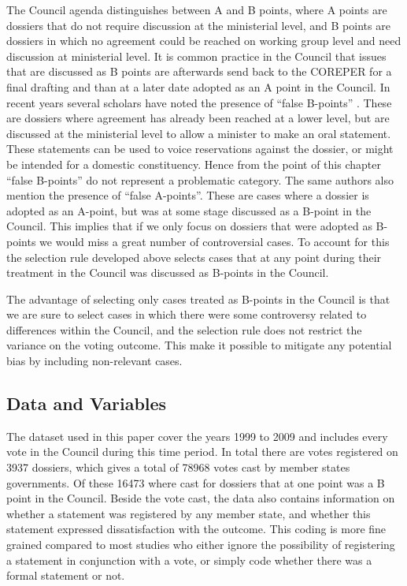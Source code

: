 The Council agenda distinguishes between A and B points, where A points are dossiers that do not require discussion at the ministerial level, and B points are dossiers in which no agreement could be reached on working group level and need discussion at ministerial level. It is common practice in the Council that issues that are discussed as B points are afterwards send back to the COREPER for a final drafting and than at a later date adopted as an A point in the Council. In recent years several scholars have noted the presence of ``false B-points'' \citep{Lewis1998,hage2008,Muehlbock2011}. These are dossiers where agreement has already been reached at a lower level, but are discussed at the ministerial level to allow a minister to make an oral statement. These statements can be used to voice reservations against the dossier, or might be intended for a domestic constituency. Hence from the point of this chapter ``false B-points'' do not represent a problematic category. The same authors also mention the presence of ``false A-points''. These are cases where a dossier is adopted as an A-point, but was at some stage discussed as a B-point in the Council. This implies that if we only focus on dossiers that were adopted as B-points we would miss a great number of controversial cases. To account for this the selection rule developed above selects cases that at any point during their treatment in the Council was discussed as B-points in the Council. 

The advantage of selecting only cases treated as B-points in the Council is that we are sure to select cases in which there were some controversy related to differences within the Council, and the selection rule does not restrict the variance on the voting outcome. This make it possible to mitigate any potential bias by including non-relevant cases. 


\subsection{Data and Variables}
The dataset used in this paper cover the years 1999 to 2009 and includes every vote in the Council during this time period. In total there are votes registered on 3937 dossiers, which gives a total of 78968 votes cast by member states governments. Of these 16473 where cast for dossiers that at one point was a B point in the Council. Beside the vote cast, the data also contains information on whether a statement was registered by any member state, and whether this statement expressed dissatisfaction with the outcome. This coding is more fine grained compared to most studies who either ignore the possibility of registering a statement in conjunction with a vote, or simply code whether there was a formal statement or not.

